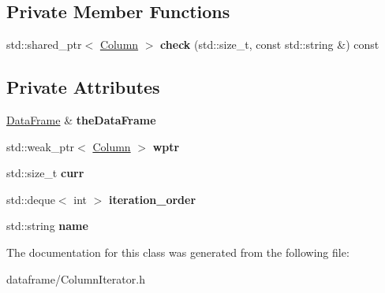 \subsection*{Private Member Functions}
\begin{DoxyCompactItemize}
\item 
\mbox{\label{classDataFrame_1_1iterator_a29b9ba18adef4b06b7826af22adf321c}} 
std\+::shared\+\_\+ptr$<$ \hyperlink{classColumn}{Column} $>$ {\bfseries check} (std\+::size\+\_\+t, const std\+::string \&) const
\end{DoxyCompactItemize}
\subsection*{Private Attributes}
\begin{DoxyCompactItemize}
\item 
\mbox{\label{classDataFrame_1_1iterator_a8ed80eba022ee261d67cd3b15ee000a4}} 
\hyperlink{classDataFrame}{Data\+Frame} \& {\bfseries the\+Data\+Frame}
\item 
\mbox{\label{classDataFrame_1_1iterator_a4ff96a40bb490d99900a75df1ad10755}} 
std\+::weak\+\_\+ptr$<$ \hyperlink{classColumn}{Column} $>$ {\bfseries wptr}
\item 
\mbox{\label{classDataFrame_1_1iterator_a558ebc6ee5d599a37feacebc604c740e}} 
std\+::size\+\_\+t {\bfseries curr}
\item 
\mbox{\label{classDataFrame_1_1iterator_a58c24bc5f769bf152fd960072372d92d}} 
std\+::deque$<$ int $>$ {\bfseries iteration\+\_\+order}
\item 
\mbox{\label{classDataFrame_1_1iterator_a53571d52ed09acbda0be89938f39e373}} 
std\+::string {\bfseries name}
\end{DoxyCompactItemize}


The documentation for this class was generated from the following file\+:\begin{DoxyCompactItemize}
\item 
dataframe/Column\+Iterator.\+h\end{DoxyCompactItemize}
